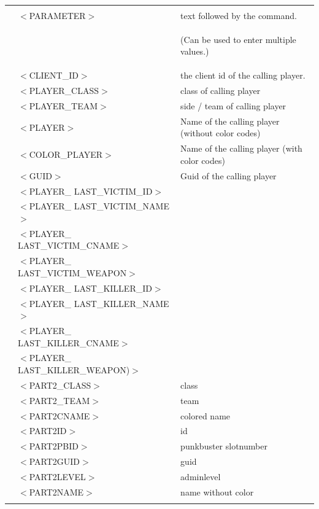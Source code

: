 \documentclass[12pt,a4paper]{article}
\numberwithin{footnote}{page} %
\begin{document}
\begin{table}[h]\footnotesize
\begin{tabular}{l l|l}
\hline & & \\
 & $<$PARAMETER$>$					& text followed by the command.  \\
 && \begin{small}
(Can be used to enter multiple values.)
\end{small} \\
 & $<$CLIENT\_ID$>$					& the client id of the calling player.\\
 & $<$PLAYER\_CLASS$>$ 				& class of calling player\\
 & $<$PLAYER\_TEAM$>$ 				& side / team of calling player \\
 & $<$PLAYER$>$						& Name of the calling player (without color codes)\\
 & $<$COLOR\_PLAYER$>$				& Name of the calling player (with color codes)\\
 & $<$GUID$>$						& Guid of the calling player\\
 
 & $<$PLAYER\_ LAST\_VICTIM\_ID$>$ 		& 		\\
 & $<$PLAYER\_ LAST\_VICTIM\_NAME$>$ 	&		\\
 & $<$PLAYER\_ LAST\_VICTIM\_CNAME$>$ 	&		\\
 & $<$PLAYER\_ LAST\_VICTIM\_WEAPON$>$ 	&		\\

 & $<$PLAYER\_ LAST\_KILLER\_ID$>$ 		&		\\ 
 & $<$PLAYER\_ LAST\_KILLER\_NAME$>$ 	& 		\\ 
 & $<$PLAYER\_ LAST\_KILLER\_CNAME$>$ 	& 		\\ 
 & $<$PLAYER\_ LAST\_KILLER\_WEAPON)$>$ & 		\\ 
 
 & $<$PART2\_CLASS$>$					& class				\\
 & $<$PART2\_TEAM$>$ 					& team				\\
 & $<$PART2CNAME$>$						& colored name		\\
 & $<$PART2ID$>$						& id				\\
 & $<$PART2PBID$>$						& punkbuster slotnumber\\
 & $<$PART2GUID$>$						& guid				\\
 & $<$PART2LEVEL$>$						& adminlevel		\\
 & $<$PART2NAME$>$						& name without color\\

 & &  \\
 \hline
\end{tabular}
\end{table}
\end{document}
